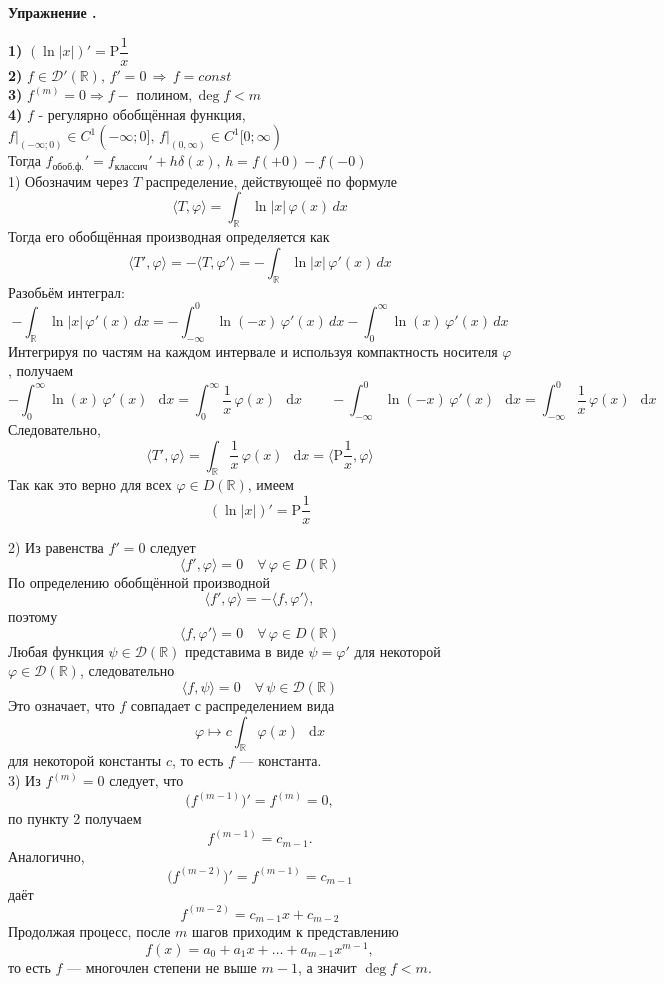 \documentclass[11pt,a4paper]{report}
\numberwithin{equation}{section}
\numberwithin{figure}{chapter}
\numberwithin{table}{chapter}
\newif\ifinmathphysstatement
\newenvironment{myexe}[1][]{%
    \refstepcounter{exectr}%
    \inmathphysstatementtrue
    \begin{tcolorbox}[mathphysblock,colframe=exercisecolor,colback=exercisecolor!3,#1]
    \textbf{\color{exercisecolor}Упражнение \theexectr.}\par\smallskip
}{%
    \end{tcolorbox}
    \inmathphysstatementfalse
}
\newcommand{\R}{\mathbb{R}}
\newcommand{\DR}{\mathcal{D}(\R)}
\newcommand{\DDR}{\mathcal{D}'(\R)}
\newcommand{\dd}{\mathop{}\!\mathrm{d}}
\newcommand{\PP}{\mathrm{P}\dfrac{1}{x}}
\begin{document}
\begin{myexe}
    \textbf{1)} $(\ln|x|)'=\PP$ \\
    \textbf{2)} $f\in\DDR, \, f'=0 \, \Rightarrow \, f=const$ \\
    \textbf{3)} $f^{(m)}=0 \Rightarrow f -$ полином$, \deg f<m$ \\
    \textbf{4)} $f$ - регулярно обобщённая функция, $f\big |_{(-\infty; 0)} \in C^1(-\infty; 0], \, f\big |_{(0, \infty)}\in C^1[0; \infty)$ \\
    Тогда $f_{\text{обоб.ф.}}'=f_{\text{классич}}'+h\delta(x), \, h=f(+0)-f(-0)$
\\
1) Обозначим через $T$ распределение, действующеё по формуле
\[
\langle T,\varphi\rangle = \int_{\R} \ln|x|\,\varphi(x)\,dx
\]
Тогда его обобщённая производная определяется как
\[
\langle T',\varphi\rangle = -\langle T,\varphi'\rangle
= -\int_{\R} \ln|x|\,\varphi'(x)\,dx
\]
Разобьём интеграл:
\[
-\int_{\R} \ln|x|\,\varphi'(x)\,dx
= -\int_{-\infty}^{0} \ln(-x)\,\varphi'(x)\,dx
  -\int_{0}^{\infty} \ln(x)\,\varphi'(x)\,dx
\]
Интегрируя по частям на каждом интервале и используя компактность
носителя $\varphi$, получаем
\[
-\int_{0}^{\infty} \ln(x)\,\varphi'(x)\,\dd x 
= \int_{0}^{\infty} \frac{1}{x}\,\varphi(x)\,\dd x 
\qquad
-\int_{-\infty}^{0} \ln(-x)\,\varphi'(x)\,\dd x 
= \int_{-\infty}^{0} \frac{1}{x}\,\varphi(x)\,\dd x 
\]
Следовательно,
\[
\langle T',\varphi\rangle
= \int_{\R} \frac{1}{x}\,\varphi(x)\,\dd x 
= \Big\langle \PP,\varphi\Big\rangle
\]
Так как это верно для всех $\varphi\in D(\mathbb{R})$, имеем
\[
(\ln|x|)' = \PP
\]

2)
Из равенства $f'=0$ следует
\[
\langle f',\varphi\rangle = 0 \quad \forall\,\varphi\in D(\mathbb{R})
\]
По определению обобщённой производной
\[
\langle f',\varphi\rangle = -\langle f,\varphi'\rangle,
\]
поэтому
\[
\langle f,\varphi'\rangle = 0 \quad \forall\,\varphi\in D(\mathbb{R})
\]
Любая функция $\psi\in \DR$ представима в виде $\psi=\varphi'$
для некоторой $\varphi\in \DR$, следовательно
\[
\langle f,\psi\rangle = 0 \quad \forall\,\psi\in \DR
\]
Это означает, что $f$ совпадает с распределением вида
\[
\varphi \mapsto c\int_{\R} \varphi(x)\,\dd x 
\]
для некоторой константы $c$, то есть $f$ — константа.\\


3)
Из $f^{(m)}=0$ следует, что
\[
\bigl(f^{(m-1)}\bigr)' = f^{(m)} = 0,
\]
по пункту 2 получаем
\[
f^{(m-1)} = c_{m-1}.
\]
Аналогично,
\[
\bigl(f^{(m-2)}\bigr)' = f^{(m-1)} = c_{m-1}
\]
даёт
\[
f^{(m-2)} = c_{m-1}x + c_{m-2}
\]
Продолжая процесс, после $m$ шагов приходим к представлению
\[
f(x) = a_0 + a_1 x + \dots + a_{m-1} x^{m-1},
\]
то есть $f$ — многочлен степени не выше $m-1$, а значит $\deg f < m$.\\


\end{myexe}
\end{document}
